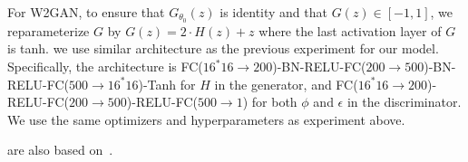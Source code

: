 \documentclass[runningheads]{llncs}
\begin{document}
For W2GAN, to ensure that $G_{\theta_0}(z)$ is identity and that $G(z) \in [-1, 1]$, we reparameterize $G$ by $G(z) = 2\cdot H(z) + z$ where the last activation layer of $G$ is tanh. we use similar architecture as the previous experiment for our model. Specifically, the architecture is FC($16^*16 \rightarrow 200$)-BN-RELU-FC($200 \rightarrow 500$)-BN-RELU-FC($500 \rightarrow 16^*16$)-Tanh for $H$ in the generator, and FC($16^*16 \rightarrow 200$)-RELU-FC($200 \rightarrow 500$)-RELU-FC($500 \rightarrow 1$) for both $\phi$ and $\epsilon$ in the discriminator. We use the same optimizers and hyperparameters as experiment above. %

are also based on~\citep{gulrajani2017improved}.

\end{document}
